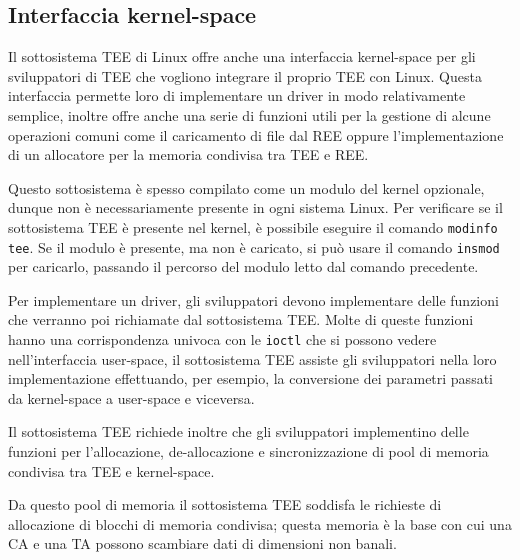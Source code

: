\documentclass[12pt,italian]{report}
\begin{document}
\subsection{Interfaccia kernel-space}
\label{sec:interfaccia-kernel-space}
Il sottosistema TEE di Linux offre anche una interfaccia kernel-space per
gli sviluppatori di TEE che vogliono integrare il proprio TEE con Linux.
Questa interfaccia permette loro di implementare un driver in modo
relativamente semplice, inoltre offre anche una serie di funzioni
utili per la gestione di alcune operazioni comuni come il caricamento
di file dal REE oppure l'implementazione di un allocatore per la memoria
condivisa tra TEE e REE.

Questo sottosistema è spesso compilato come un modulo del kernel opzionale,
dunque non è necessariamente presente in ogni sistema Linux.
Per verificare se il sottosistema TEE è presente nel kernel, è possibile
eseguire il comando \texttt{modinfo tee}.
Se il modulo è presente, ma non è caricato, si può usare il comando
\texttt{insmod} per caricarlo, passando il percorso del modulo letto
dal comando precedente.

\bigbreak \noindent

Per implementare un driver, gli sviluppatori devono implementare
delle funzioni che verranno poi richiamate dal sottosistema TEE.
Molte di queste funzioni hanno una corrispondenza univoca con le
\texttt{ioctl} che si possono vedere nell'interfaccia user-space,
il sottosistema TEE assiste gli sviluppatori nella loro
implementazione effettuando, per esempio, la conversione dei parametri
passati da kernel-space a user-space e viceversa.

Il sottosistema TEE richiede inoltre che gli sviluppatori
implementino delle funzioni per l'allocazione, de-allocazione e
sincronizzazione di pool di memoria condivisa tra TEE e kernel-space.

Da questo pool di memoria il sottosistema TEE soddisfa le richieste
di allocazione di blocchi di memoria condivisa; questa memoria è la base
con cui una CA e una TA possono scambiare dati di dimensioni non banali.
\end{document}
